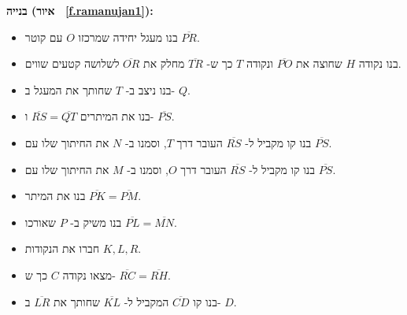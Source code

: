 \textbf{בנייה (איור%
~\ref{f.ramanujan1}):}
\begin{itemize}
\item
בנו מעגל יחידה שמרכזו 
$O$
עם קוטר
$\overline{PR}$.
\item
בנו נקודה
$H$
שחוצה את
$\overline{PO}$
ונקודה
$T$
כך ש-%
$\overline{TR}$
מחלק את 
$\overline{OR}$
לשלושה קטעים שווים.
\item
בנו ניצב ב-%
$T$
שחותך את המעגל ב-%
$Q$.
\item
בנו את המיתרים
$\overline{RS}=\overline{QT}$
ו-%
$\overline{PS}$.
\item
בנו קו מקביל ל-%
$\overline{RS}$
העובר דרך
$T$,
וסמנו ב-%
$N$
את החיתוך שלו עם 
$\overline{PS}$.
\item
בנו קו מקביל ל-%
$\overline{RS}$
העובר דרך
$O$,
וסמנו ב-%
$M$
את החיתוך שלו עם 
$\overline{PS}$.
\item
בנו את המיתר
$\overline{PK}=\overline{PM}$.
\item
בנו משיק ב-%
$P$
שאורכו
$\overline{PL}=\overline{MN}$.
\item
חברו את הנקודות
$K,L,R$.
\item
מצאו נקודה 
$C$
כך ש-%
$\overline{RC}=\overline{RH}$.
\item
בנו קו
$\overline{CD}$
המקביל ל-%
$\overline{KL}$
שחותך את
$\overline{LR}$ 
ב-%
$D$. 
\end{itemize}

